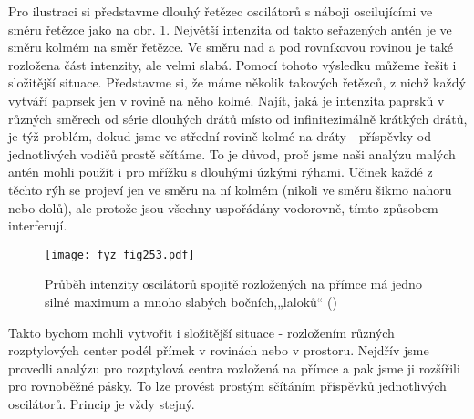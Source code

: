     Pro ilustraci si představme dlouhý řetězec oscilátorů s náboji oscilujícími ve směru řetězce 
    jako na obr. \ref{fyz:fig253}. Největší intenzita od takto seřazených antén je ve směru kolmém 
    na směr řetězce. Ve směru nad a pod rovníkovou rovinou je také rozložena část intenzity, ale 
    velmi slabá. Pomocí tohoto výsledku můžeme řešit i složitější situace. Představme si, že máme 
    několik takových řetězců, z nichž každý vytváří paprsek jen v rovině na něho kolmé. Najít, jaká 
    je intenzita paprsků v různých směrech od série dlouhých drátů místo od infinitezimálně 
    krátkých drátů, je týž problém, dokud jsme ve střední rovině kolmé na dráty - příspěvky od 
    jednotlivých vodičů prostě sčítáme. To je důvod, proč jsme naši analýzu malých antén mohli 
    použít i pro mřížku s dlouhými úzkými rýhami. Učinek každé z těchto rýh se projeví jen ve směru 
    na ní kolmém (nikoli ve směru šikmo nahoru nebo dolů), ale protože jsou všechny uspořádány 
    vodorovně, tímto způsobem interferují.

    \begin{figure}[ht!] %
      \centering
      \texttt{[image: fyz\_fig253.pdf]}
      \caption{Průběh intenzity oscilátorů spojitě rozložených na přímce má jedno silné maximum a 
               mnoho slabých bočních,„laloků“
               (\cite[s.~398]{Feynman01})}
      \label{fyz:fig253}
    \end{figure}
    
    Takto bychom mohli vytvořit i složitější situace - rozložením různých rozptylových center podél 
    přímek v rovinách nebo v prostoru. Nejdřív jsme provedli analýzu pro rozptylová centra 
    rozložená na přímce a pak jsme ji rozšířili pro rovnoběžné pásky. To lze provést prostým 
    sčítáním příspěvků jednotlivých oscilátorů. Princip je vždy stejný.
    
